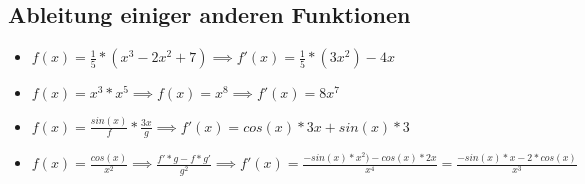 \newpage
\subsection{Ableitung einiger anderen Funktionen}

\begin{itemize}
    \item $f(x)=\frac{1}{5}*(x^3-2x^2+7) \implies f'(x)=\frac{1}{5}*(3x^2)-4x$
    \item $f(x)=x^3*x^5 \implies f(x)=x^8 \implies f'(x)=8x^7$
    \item $f(x)=\frac{sin(x)}{f}*\frac{3x}{g} \implies f'(x)=cos(x)*3x+sin(x)*3$
    \item $f(x)=\frac{cos(x)}{x^2} \implies \frac{f'*g - f*g'}{g^2} \implies f'(x)=\frac{-sin(x)*x^2)-cos(x)*2x}{x^4} = \frac{-sin(x)*x-2*cos(x)}{x^3}$
\end{itemize}
